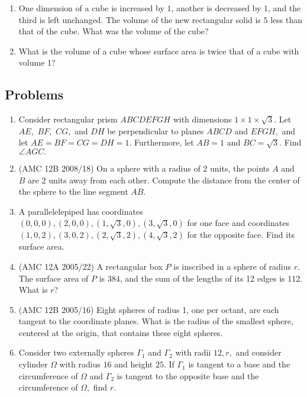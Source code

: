 \begin{enumerate}
\item One dimension of a cube is increased by $1$, another is decreased by $1$, and the third is left unchanged. The volume of the new rectangular solid is $5$ less than that of the cube. What was the volume of the cube?

\item What is the volume of a cube whose surface area is twice that of a cube with volume 1?
\end{enumerate}

\subsection{Problems}

\begin{enumerate}
\item Consider rectangular prism $ABCDEFGH$ with dimensions $1 \times 1 \times \sqrt{3}.$ Let $AE,$ $BF,$ $CG,$ and $DH$ be perpendicular to planes $ABCD$ and $EFGH,$ and let $AE = BF = CG = DH = 1.$ Furthermore, let $AB = 1$ and $BC = \sqrt{3}.$ Find $\angle AGC.$

\item (AMC 12B 2008/18) On a sphere with a radius of $2$ units, the points $A$ and $B$ are $2$ units away from each other. Compute the distance from the center of the sphere to the line segment $AB.$

\item A parallelelepiped has coordinates $(0,0,0),(2,0,0),(1,\sqrt{3},0),(3,\sqrt{3},0)$ for one face and coordinates $(1,0,2),(3,0,2),(2,\sqrt{3},2),(4,\sqrt{3},2)$ for the opposite face. Find its surface area.

\item (AMC 12A 2005/22) A rectangular box $P$ is inscribed in a sphere of radius $r$. The surface area of $P$ is 384, and the sum of the lengths of its 12 edges is 112. What is $r$?

\item (AMC 12B 2005/16) Eight spheres of radius 1, one per octant, are each tangent to the coordinate planes. What is the radius of the smallest sphere, centered at the origin, that contains these eight spheres.

\item Consider two externally spheres $\Gamma_1$ and $\Gamma_2$ with radii $12,r,$ and consider cylinder $\Omega$ with radius $16$ and height $25.$ If $\Gamma_1$ is tangent to a base and the circumference of $\Omega$ and $\Gamma_2$ is tangent to the opposite base and the circumference of $\Omega,$ find $r.$


\end{enumerate}
